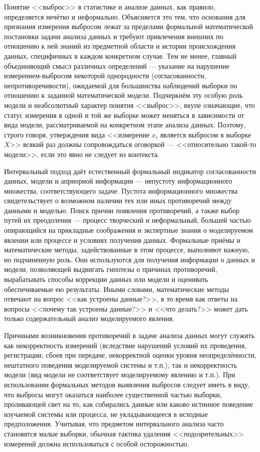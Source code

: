 \documentclass[a5paper,openany]{book}
\begin{document}
Понятие <<выброс>> в статистике и анализе данных, как правило, определяется нечётко 
и неформально. Объясняется это тем, что основания для признания измерения выбросом 
лежат за пределами формальной математической постановки задачи анализа данных и 
требуют привлечения внешних по отношению к ней знаний из предметной области и истории 
происхождения данных, специфичных в каждом конкретном случае. Тем не менее, главный 
объединяющий смысл различных определений --- указание на нарушение измерением-выбросом 
некоторой однородности (согласованности, непротиворечивости), ожидаемой для большинства 
наблюдений выборки по отношению к заданной математической модели. Подчеркнём эту особую 
роль модели и неабсолютный  характер понятия <<выброс>>, вкупе означающие, что статус 
измерения в одной и той же выборке может меняться в зависимости от вида модели, 
рассматриваемой на конкретном этапе анализа данных. Поэтому, строго говоря, 
утверждения вида <<измерение $x_i$ является выбросом в выборке $X$>> всякий раз 
должны сопровождаться оговоркой --- <<относительно такой-то модели>>, если это явно 
не следует из контекста. 

Интервальный подход даёт естественный формальный индикатор согласованности данных, 
модели и априорной информации — непустоту информационного множества, соответствующего 
задаче. Пустота информационного множества свидетельствует о возможном наличии тех или 
иных противоречий между данными и моделью. Поиск причин появления противоречий, а 
также выбор путей их преодоления --- процесс творческий и неформальный, большей частью 
опирающийся на прикладные соображения и экспертные знания о моделируемом явлении 
или процессе и условиях получения данных. Формальные приёмы и математические методы, 
задействованные в этом процессе, выполняют важную, но подчиненную роль. Они используются 
для получения информации о данных и модели, позволяющей выдвигать гипотезы о причинах  
противоречий, вырабатывать способы коррекции данных или модели и оценивать обеспечиваемые 
ею результаты. Иными словами, математические методы отвечают на вопрос <<как устроены 
данные?>>, в то время как ответы на вопросы <<почему так устроены данные?>> и 
<<что делать?>> может дать только содержательный анализ моделируемого явления. 

Причинами  возникновения противоречий в задаче анализа данных могут служить 
как некорректность измерений (вследствие нарушений условий их проведения, регистрации, 
сбоев при передаче, некорректной оценки уровня неопределённости, нештатного поведения 
моделируемой системы и т.п.), так и некорректность модели (вид модели не соответствует 
моделируемому явлению и т.п.). При использовании формальных методов выявления выбросов 
следует иметь в виду, что выбросы могут оказаться наиболее существенной частью выборки, 
проливающей свет на то, как собирались данные или каково истинное поведение изучаемой 
системы или процесса, не укладывающееся в исходные предположения. Учитывая, что 
предметом интервального анализа часто становятся малые выборки, обычная тактика 
удаления <<подозрительных>> измерений должна использоваться с особой осторожностью. 
  
\end{document}
